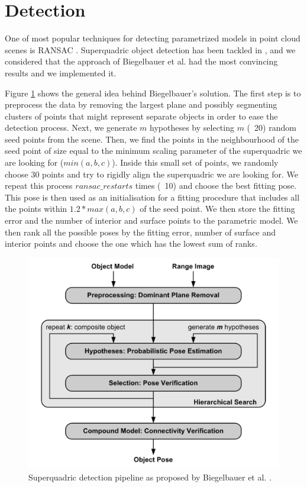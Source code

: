 \documentclass{article}
\begin{document}
\section {Detection}
\label{sec:detection}

One of most popular techniques for detecting parametrized models in point cloud scenes is RANSAC \cite{fischler1981random}. Superquadric object detection has been tackled in \cite{afanasyev3d} \cite{conf/caip/KrivicS01} \cite{conf/icra/BiegelbauerV07}, and we considered that the approach of Biegelbauer et al. \cite{conf/icra/BiegelbauerV07} had the most convincing results and we implemented it.

Figure \ref{fig:superquadric_detection_schematic} shows the general idea behind Biegelbauer's solution. The first step is to preprocess the data by removing the largest plane and possibly segmenting clusters of points that might represent separate objects in order to ease the detection process. Next, we generate $m$ hypotheses by selecting $m$ (~20) random seed points from the scene. Then, we find the points in the neighbourhood of the seed point of size equal to the minimum scaling parameter of the superquadric we are looking for ($min (a, b, c)$). Inside this small set of points, we randomly choose 30 points and try to rigidly align the superquadric we are looking for. We repeat this process $ransac\_restarts$ times (~10) and choose the best fitting pose. This pose is then used as an initialisation for a fitting procedure that includes all the points within $1.2 * max(a,b,c)$ of the seed point. We then store the fitting error and the number of interior and surface points to the parametric model. We then rank all the possible poses by the fitting error, number of surface and interior points and choose the one which has the lowest sum of ranks.

\begin{figure}
\centering
\includegraphics[width=0.55\columnwidth]{figures/superquadric_detection_schematic}

\caption{Superquadric detection pipeline as proposed by Biegelbauer et al. \cite{conf/icra/BiegelbauerV07}.}
\label{fig:superquadric_detection_schematic}
\end{figure}
\end{document}

